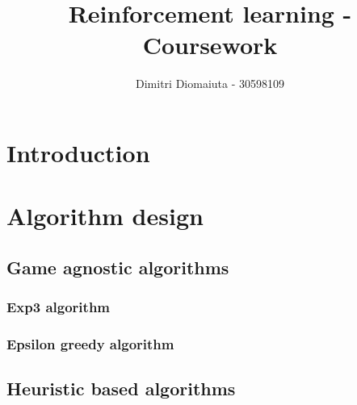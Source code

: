 \documentclass[runningheads]{llncs}
\begin{document}
%
\title{Reinforcement learning - Coursework}
%
%
\author{Dimitri Diomaiuta - 30598109}
%
%
%
\maketitle              %
%
%
%
%

\section{Introduction}

\section{Algorithm design}

\subsection{Game agnostic algorithms}
\subsubsection{Exp3 algorithm}
\subsubsection{Epsilon greedy algorithm}

\subsection{Heuristic based algorithms}
\end{document}
